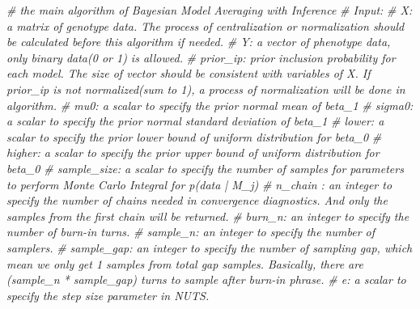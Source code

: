 \documentclass[
]{article}
\newenvironment{Shaded}{\begin{snugshade}}{\end{snugshade}}
\newcommand{\CommentTok}[1]{\textcolor[rgb]{0.56,0.35,0.01}{\textit{#1}}}
\begin{document}
\begin{Shaded}
\begin{Highlighting}[]
\CommentTok{# the main algorithm of Bayesian Model Averaging with Inference}
\CommentTok{# Input:}
\CommentTok{# X: a matrix of genotype data. The process of centralization or normalization should be calculated before this algorithm if needed.}
\CommentTok{# Y: a vector of phenotype data, only binary data(0 or 1) is allowed. }
\CommentTok{# prior_ip: prior inclusion probability for each model. The size of vector should be consistent with variables of X. If prior_ip is not normalized(sum to 1), a process of normalization will be done in algorithm.}
\CommentTok{# mu0: a scalar to specify the prior normal mean of beta_1}
\CommentTok{# sigma0: a scalar to specify the prior normal standard deviation of beta_1}
\CommentTok{# lower: a scalar to specify the prior lower bound of uniform distribution for beta_0}
\CommentTok{# higher: a scalar to specify the prior upper bound of uniform distribution for beta_0}
\CommentTok{# sample_size: a scalar to specify the number of samples for parameters to perform Monte Carlo Integral for p(data | M_j)}
\CommentTok{# n_chain : an integer to specify the number of chains needed in convergence diagnostics. And only the samples from the first chain will be returned.}
\CommentTok{# burn_n: an integer to specify the number of burn-in turns.}
\CommentTok{# sample_n: an integer to specify the number of samplers.}
\CommentTok{# sample_gap: an integer to specify the number of sampling gap, which mean we only get 1 samples from total gap samples. Basically, there are (sample_n * sample_gap) turns to sample after burn-in phrase.}
\CommentTok{# e: a scalar to specify the step size parameter in NUTS.}


\end{Highlighting}
\end{Shaded}
\end{document}
